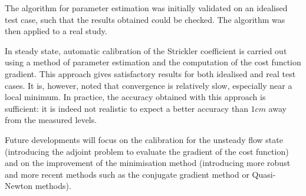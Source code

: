 The algorithm for parameter estimation was initially validated on an idealised test case, such that the results obtained could be checked. The algorithm was then applied to a real study.

\vspace{0.5cm}

In steady state, automatic calibration of the Strickler coefficient is carried out using a method of parameter estimation and the computation of the cost function gradient. This approach gives satisfactory results for both idealised and real test cases. It is, however, noted that convergence is relatively slow, especially near a local minimum. In practice, the accuracy obtained with this approach is sufficient: it is indeed not realistic to expect a better accuracy than $1cm$ away from the measured levels.

\vspace{0.5cm}

Future developments will focus on the calibration for the unsteady flow state (introducing the adjoint problem to evaluate the gradient of the cost function) and on the improvement of the minimisation method (introducing more robust and more recent methods such as the conjugate gradient method or Quasi-Newton methods).

